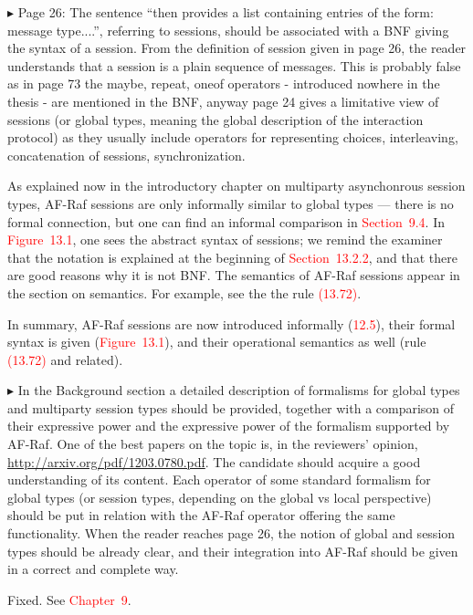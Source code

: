 \documentclass{article}
\newcommand*\R[1]{\textcolor{red}{#1}} %
\newenvironment{them}%
  {\bigskip\noindent\begingroup\color{blue}$\blacktriangleright$\enspace}%
  {\endgroup\par}
\begin{document}
\begin{them}
Page 26:
The sentence ``then provides a list containing entries of the form: message
type....'', referring to sessions, should be associated with a BNF giving the
syntax of a session. From the definition of session given in page 26, the
reader understands that a session is a plain sequence of messages. This is
probably false as in page 73 the maybe, repeat, oneof operators - introduced
nowhere in the thesis - are mentioned in the BNF, anyway page 24 gives a
limitative view of sessions (or global types, meaning the global description of
the interaction protocol) as they usually include operators for representing
choices, interleaving, concatenation of sessions, synchronization. 
\end{them}

As explained now in the introductory chapter on multiparty asynchonrous session
types, AF-Raf sessions are only informally similar to global types --- there is
no formal connection, but one can find an informal comparison in
\R{Section~9.4}. In \R{Figure~13.1}, one sees the abstract syntax of sessions;
we remind the examiner that the notation is explained at the beginning of
\R{Section~13.2.2}, and that there are good reasons why it is not BNF.  The
semantics of AF-Raf sessions appear in the section on semantics.  For example,
see the the rule \R{(13.72)}.

In summary,
  AF-Raf sessions are now introduced informally (\R{12.5}),
  their formal syntax is given (\R{Figure~13.1}),
  and their operational semantics as well (rule \R{(13.72)} and related).


\begin{them}
In the Background section a detailed description of formalisms for global types
and multiparty session types should be provided, together with a comparison of
their expressive power and the expressive power of the formalism supported by
AF-Raf. One of the best papers on the topic is, in the reviewers' opinion,
\url{http://arxiv.org/pdf/1203.0780.pdf}. The candidate should acquire a good
understanding of its content. Each operator of some standard formalism for
global types (or session types, depending on the global vs local perspective)
should be put in relation with the AF-Raf operator offering the same
functionality. When the reader reaches page 26, the notion of global and
session types should be already clear, and their integration into AF-Raf should
be given in a correct and complete way.
\end{them}
Fixed. See \R{Chapter~9}.
\end{document}
